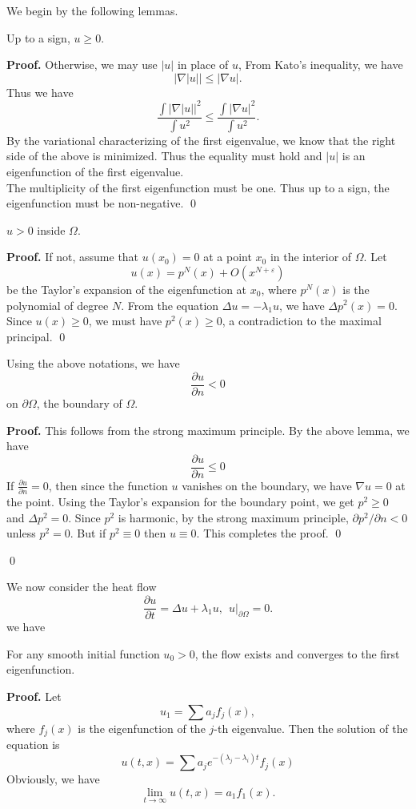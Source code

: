We begin by the following lemmas.
\begin{lemma}
Up to a sign, $u \geqslant 0$.
\end{lemma}
{\bf Proof.}
Otherwise, we may use $|u|$ in place of $u$, From Kato's inequality, we have
\[
|\nabla|u|| \leqslant |\nabla u|.
\]
Thus we have
\[
\frac{\int |\nabla|u||^2}{\int u^2} \leqslant \frac{\int |\nabla u|^2}{\int u^2}.
\]
By the variational characterizing of the first eigenvalue, we know that the
right side of the above is minimized. Thus the equality must hold and $|u|$ is an
eigenfunction of the first eigenvalue.
\\

The multiplicity of the first eigenfunction must be one. Thus up to a sign, the
eigenfunction must be non-negative.
\qed

\begin{lemma}
$u > 0$ inside $\Omega$.
\end{lemma}
{\bf Proof.}
If not, assume that $u(x_0) = 0$ at a point $x_0$ in the interior of $\Omega$.
Let
\[
u(x) = p^N(x) + O(x^{N+\varepsilon})
\]
be the Taylor's expansion of the eigenfunction at $x_0$, where $p^N(x)$ is the
polynomial of degree $N$. From the equation $\Delta u = -\lambda_1 u$, we have
$\Delta p^2(x) = 0$. Since $u(x) \geqslant 0$, we must have $p^2(x)\geqslant 0$,
a contradiction to the maximal principal.
\qed

\begin{lemma}
Using the above notations, we have
\[
\frac{\partial u}{\partial n} < 0
\]
on $\partial\Omega$, the boundary of $\Omega$.
\end{lemma}
{\bf Proof.}
This follows from the strong maximum principle. By the above lemma, we have
\[
\frac{\partial u}{\partial n} \leqslant 0
\]
If $\frac{\partial u}{\partial n} = 0$, then since the function $u$ vanishes on
the boundary, we have $\nabla u = 0$ at the point. Using the Taylor's expansion
for the boundary point, we get $p^2 \geqslant 0$ and $\Delta p^2 = 0$. Since $p^2$ is harmonic, by the
strong maximum principle, $\partial p^2/\partial n < 0$ unless $p^2 =0$. But if
$p^2 \equiv 0$ then $u \equiv 0$. This completes the proof.
\qed


\qed


We now consider the heat flow
\[
\frac{\partial u}{\partial t} = \Delta u + \lambda_1 u,
\ \ u|_{\partial\Omega} = 0.
\]
we have
\begin{lemma}
For any smooth initial function $u_0 > 0$, the flow exists and converges to the
first eigenfunction.
\end{lemma}
{\bf Proof.}
Let
\[
u_1 = \sum a_j f_j(x),
\]
where $f_j(x)$ is the eigenfunction of the $j$-th eigenvalue. Then the solution
of the equation is
\[
u(t, x) = \sum a_j e^{-(\lambda_j-\lambda_i)t}f_j(x)
\]
Obviously, we have
\[
\lim_{t\rightarrow\infty} u(t,x) = a_1 f_1(x).
\]

